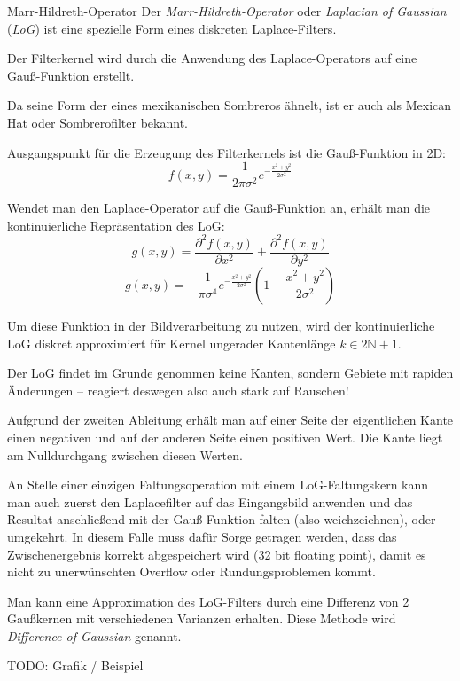 \begin{defi}[Kantendetektor]{Marr-Hildreth-Operator}
    Der \emph{Marr-Hildreth-Operator} oder \emph{Laplacian of Gaussian} (\emph{LoG}) ist eine spezielle Form eines diskreten Laplace-Filters.

    Der Filterkernel wird durch die Anwendung des Laplace-Operators auf eine Gauß-Funktion erstellt.

    Da seine Form der eines mexikanischen Sombreros ähnelt, ist er auch als Mexican Hat oder Sombrerofilter bekannt.

    Ausgangspunkt für die Erzeugung des Filterkernels ist die Gauß-Funktion in 2D:
    \[
        f(x,y) = \frac {1}{2\pi \sigma^{2}} e^{-\frac {x^{2}+y^{2}}{2\sigma ^{2}}}
    \]

    Wendet man den Laplace-Operator auf die Gauß-Funktion an, erhält man die kontinuierliche Repräsentation des LoG:
    \[
        g(x,y) = \frac {\partial ^{2}f(x,y)}{\partial x^{2}} + \frac {\partial^{2}f(x,y)}{\partial y^{2}}
    \]
    \[
        g(x,y) = -\frac {1}{\pi \sigma ^{4}} e^{-\frac {x^{2}+y^{2}}{2\sigma ^{2}}} \left(1-{\frac {x^{2}+y^{2}}{2\sigma ^{2}}}\right)
    \]

    Um diese Funktion in der Bildverarbeitung zu nutzen, wird der kontinuierliche LoG diskret approximiert für Kernel ungerader Kantenlänge $k \in 2 \mathbb{N} + 1$.

    Der LoG findet im Grunde genommen keine Kanten, sondern Gebiete mit rapiden Änderungen -- reagiert deswegen also auch stark auf Rauschen!

    Aufgrund der zweiten Ableitung erhält man auf einer Seite der eigentlichen Kante einen negativen und auf der anderen Seite einen positiven Wert.
    Die Kante liegt am Nulldurchgang zwischen diesen Werten.

    An Stelle einer einzigen Faltungsoperation mit einem LoG-Faltungskern kann man auch zuerst den Laplacefilter auf das Eingangsbild anwenden und das Resultat anschließend mit der Gauß-Funktion falten (also weichzeichnen), oder umgekehrt. In diesem Falle muss dafür Sorge getragen werden, dass das Zwischenergebnis korrekt abgespeichert wird (32 bit floating point), damit es nicht zu unerwünschten Overflow oder Rundungsproblemen kommt.

    Man kann eine Approximation des LoG-Filters durch eine Differenz von 2 Gaußkernen mit verschiedenen Varianzen erhalten.
    Diese Methode wird \emph{Difference of Gaussian} genannt.

    TODO: Grafik / Beispiel
\end{defi}

